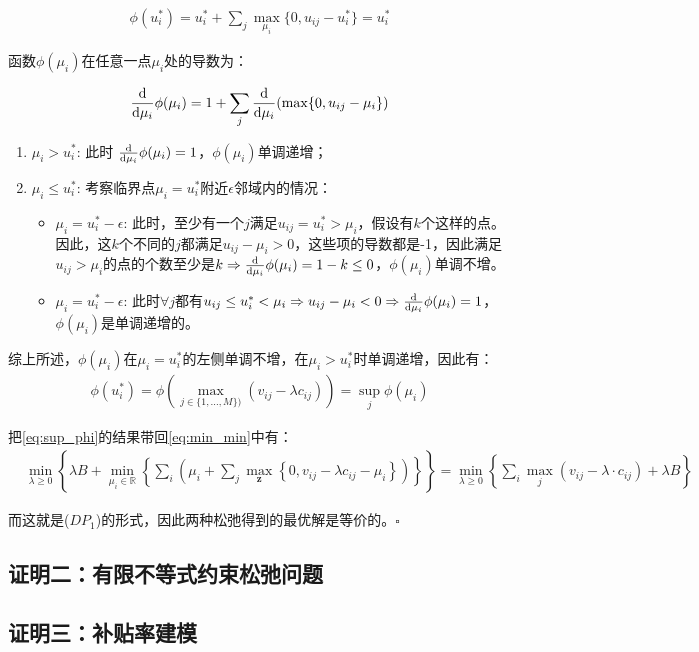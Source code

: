 \documentclass[12pt, a4paper]{article}
\begin{document}
\begin{align}
    \phi(u_i^*) = u_i^* + \sum_j \max_{\mu_i}\{0,u_{ij} - u_i^*\} = u_i^*
\end{align}

函数$\phi(\mu_i)$在任意一点$\mu_i$处的导数为：

\begin{align}
    \frac{\rm d}{{\rm d}\mu_i}\phi(\mu_i) = 1 + \sum_j \frac{\rm d}{{\rm d}\mu_i}(\max\{0,u_{ij}-\mu_i\})
\end{align}

\begin{enumerate}
    \item $\mu_i > u_i^*$: 此时 $\frac{\rm d}{{\rm d}\mu_i}\phi(\mu_i) = 1$，$\phi(\mu_i)$单调递增；
    \item $\mu_i \leq u_i^*$: 考察临界点$\mu_i = u_i^*$附近$\epsilon$邻域内的情况：
    \begin{itemize}
        \item $\mu_i = u_i^*-\epsilon$: 此时，至少有一个$j$满足$u_{ij} = u_i^* > \mu_i$，假设有$k$个这样的点。因此，这$k$个不同的$j$都满足$u_{ij} - \mu_i>0$，这些项的导数都是-1，因此满足$u_{ij}>\mu_i$的点的个数至少是$k \Rightarrow \frac{\rm d}{{\rm d}\mu_i}\phi(\mu_i) =1-k\leq 0$，$\phi(\mu_i)$单调不增。
        \item $\mu_i = u_i^*-\epsilon$: 此时$\forall j$都有$u_{ij}\leq u_i^* < \mu_i\Rightarrow u_{ij}-\mu_i <0 \Rightarrow \frac{\rm d}{{\rm d}\mu_i}\phi(\mu_i) = 1$，$\phi(\mu_i)$是单调递增的。
    \end{itemize}
\end{enumerate}

综上所述，$\phi(\mu_i)$在$\mu_i = u_i^*$的左侧单调不增，在$\mu_i>u_i^*$时单调递增，因此有：
\begin{align}\label{eq:sup_phi}
    \phi(u_i^*) = \phi\left(\max_{j\in \{1,\ldots,M\})}(v_{ij} - \lambda c_{ij}) \right) = \sup_{j}\phi(\mu_i)
\end{align}

把\autoref{eq:sup_phi}的结果带回\autoref{eq:min_min}中有：
\begin{align}
    & \min_{\lambda\geq 0} \left\{\lambda B + \min_{\mu_i \in \mathbb R} \left\{ \sum_i\left( \mu_i +\sum_j\max_{\bm z}\left\{0,v_{ij}-\lambda c_{ij}-\mu_i \right\} \right) \right\}\right\} = \min_{\lambda\geq 0} \left\{\sum_i \max_j (v_{ij}-\lambda\cdot c_{ij}) +\lambda B\right\}
\end{align}

而这就是($DP_1$)的形式，因此两种松弛得到的最优解是等价的。$\square$
\subsection{证明二：有限不等式约束松弛问题}
\subsection{证明三：补贴率建模}





\end{document}

